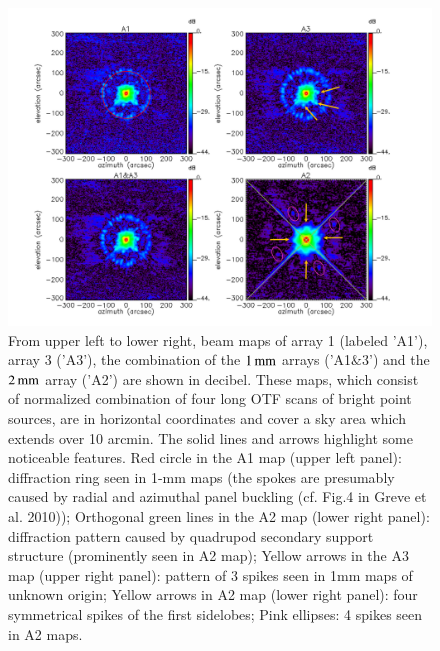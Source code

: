 \begin{figure}[!thbp]
\begin{center}
  \includegraphics[trim=0.5cm 0.5cm 1cm 0cm, clip=true, width=\linewidth]{Figures/Beams_features.pdf}
\caption[Noticeable features of NIKA2 beam pattern.]{From upper left
  to lower right, beam maps of array 1 (labeled 'A1'), array 3 ('A3'),
  the combination of the $1\,\rm{mm}$ arrays ('A1$\&$3') and the
  $2\,\rm{mm}$ array ('A2') are shown in decibel. These maps, which
  consist of normalized combination of four long OTF scans of bright
  point sources, are in horizontal coordinates and cover a sky area
  which extends over 10 arcmin. %
  The solid lines and arrows highlight some noticeable features.
  Red circle in the
  A1 map (upper left panel): diffraction ring seen in 1-mm maps
  (the spokes are presumably caused by radial and azimuthal panel buckling (cf. Fig.4 in Greve et
  al. 2010)); Orthogonal green lines in the A2 map (lower right panel): diffraction
  pattern caused by quadrupod secondary support structure (prominently
  seen in A2 map); Yellow arrows in the A3 map (upper right panel):
  pattern of 3 spikes seen in 1mm maps of unknown origin; Yellow
  arrows in A2 map (lower right panel): four symmetrical spikes of the
  first sidelobes; Pink ellipses: 4 spikes seen in A2 maps.}
\label{fig:features}
\end{center}
\end{figure}

